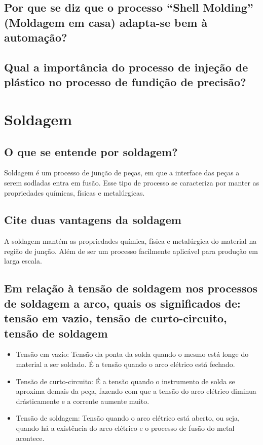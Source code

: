 \documentclass[a4paper, 12pt]{article}
\begin{document}
	\subsection{Por que se diz que o processo “Shell Molding” (Moldagem em casa) adapta-se bem à automação?}
	
	\subsection{Qual a importância do processo de injeção de plástico no processo de fundição de precisão?}
	


\newpage
\section{Soldagem}
	\subsection{O que se entende por soldagem?}
	Soldagem é um processo de junção de peças, em que a interface das peças a serem sodladas entra em fusão. Esse tipo de processo se caracteriza por manter as propriedades químicas, físicas e metalúrgicas.
	
	\subsection{Cite duas vantagens da soldagem}
	A soldagem mantém as propriedades química, física e metalúrgica do material na região de junção. Além de ser um processo facilmente aplicável para produção em larga escala.
	
	\subsection{Em relação à tensão de soldagem nos processos de soldagem a arco, quais os significados
de: tensão em vazio, tensão de curto-circuito, tensão de soldagem}
	\begin{itemize}
		\item Tensão em vazio: Tensão da ponta da solda quando o mesmo está longe do material a ser soldado. É a tensão quando o arco elétrico está fechado.
		\item Tensão de curto-circuito: É a tensão quando o instrumento de solda se aproxima demais da peça, fazendo com que a tensão do arco elétrico diminua drásticamente e a corrente aumente muito.
		\item Tensão de soldagem: Tensão quando o arco elétrico está aberto, ou seja, quando há a existência do arco elétrico e o processo de fusão do metal acontece.
	\end{itemize}
	
\end{document}
